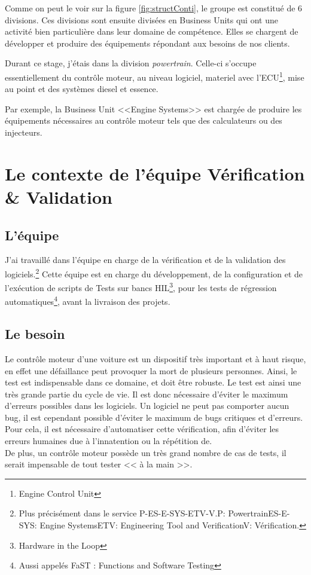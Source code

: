 		Comme on peut le voir sur la figure \ref{fig:structConti}, le groupe est constitué de 6 divisions. Ces divisions sont ensuite divisées en Business Units qui ont une activité bien particulière dans leur domaine de compétence. Elles se chargent de développer et produire des équipements répondant aux besoins de nos clients.

Durant ce stage, j'étais dans la division \textit{powertrain}. Celle-ci s'occupe essentiellement du contrôle moteur, au niveau logiciel, materiel avec l'ECU\footnote{Engine Control Unit}, mise au point et des systèmes diesel et essence.

Par exemple, la Business Unit <<Engine Systems>> est chargée de produire les équipements nécessaires au contrôle moteur tels que des calculateurs ou des 
injecteurs.

	\section{Le contexte de l'équipe Vérification \& Validation}
		\subsection{L'équipe}
		J'ai travaillé dans l'équipe en charge de la vérification et de la validation des logiciels.\footnote{Plus précisément dans le service P-ES-E-SYS-ETV-V.\newline P: Powertrain\newline ES-E-SYS: Engine Systems\newline ETV: Engineering Tool and Verification\newline V: Vérification.}
		Cette équipe est en charge du développement, de la configuration et de l'exécution de scripts de Tests sur bancs HIL\footnote{Hardware in the Loop}, pour les tests de régression automatiques\footnote{Aussi appelés FaST : Functions and Software Testing}, avant la livraison des projets.
		
		\subsection{Le besoin} \label{besoinTests}
		Le contrôle moteur d'une voiture est un dispositif très important et à haut risque, en effet une défaillance peut provoquer la mort de plusieurs personnes. Ainsi, le test est indispensable dans ce domaine, et doit être robuste. Le test est ainsi une très grande partie du cycle de vie.\newline
		 Il est donc nécessaire d'éviter le maximum d'erreurs possibles dans les logiciels. Un logiciel ne peut pas comporter aucun bug, il est cependant possible d'éviter le maximum de bugs critiques et d'erreurs. Pour cela, il est nécessaire d'automatiser cette vérification, afin d'éviter les erreurs humaines due à l'innatention ou la répétition de.\\
		De plus, un contrôle moteur possède un très grand nombre de cas de tests, il serait impensable de tout tester << à la main >>.

